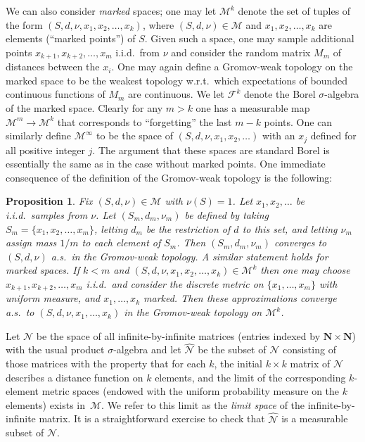 \documentclass[JEP,XML,SOM,Unicode]{cedram}
\let\mathcal\mathscr
\theoremstyle{plain}
\numberwithin{theorem}{section}
\newtheorem{proposition}[theorem]{Proposition}
\theoremstyle{definition}
\newcommand\mmspace{{\mathcal M}}
\newcommand\mmsigma{{\mathcal F}}
\newcommand{\matrixmspace}{\mathcal N}
\newcommand{\N}{\mathbf{N}}
\begin{document}
We can also consider \emph{marked} spaces; one may let $\mmspace^k$ denote the set of tuples of the form $(S,d, \nu, x_1,x_2, \ldots, x_k)$, where $(S,d,\nu) \in \mmspace$ and $x_1, x_2, \ldots, x_k$ are elements (``marked points'') of $S$. Given such a space, one may sample additional points $x_{k+1}, x_{k+2}, \ldots, x_m$ i.i.d.\ from $\nu$ and consider the random matrix $M_m$ of distances between the $x_i$. One may again define a Gromov-weak topology on the marked space to be the weakest topology w.r.t.\ which expectations of bounded continuous functions of $M_m$ are continuous. We let $\mmsigma^k$ denote the Borel $\sigma$-algebra of the marked space. Clearly for any $m > k$ one has a measurable map $\mmspace^m \to \mmspace^k$ that corresponds to ``forgetting'' the last $m-k$ points. One can similarly define $\mmspace^\infty$ to be the space of $(S, d, \nu, x_1, x_2, \ldots)$ with an $x_j$ defined for all positive integer $j$. The argument that these spaces are standard Borel is essentially the same as in the case without marked points. One immediate consequence of the definition of the Gromov-weak topology is the following:

\begin{proposition}
\label{prop::randomapproximatemetricsconverge}
Fix $(S,d,\nu) \in \mmspace$ with $\nu(S) = 1$. Let $x_1, x_2, \ldots$ be i.i.d.\ samples from $\nu$. Let $(S_{m}, d_{m}, \nu_{m})$ be defined by taking $S_{m} = \{x_1, x_2, \ldots, x_{m} \}$, letting $d_{m}$ be the restriction of $d$ to this set, and letting $\nu_{m}$ assign mass $1/m$ to each element of $S_{m}$. Then $(S_{m}, d_{m}, \nu_{m})$ converges to $(S, d, \nu)$ a.s.\ in the Gromov-weak topology. A similar statement holds for marked spaces. If $k < m$ and $(S,d,\nu, x_1, x_2, \ldots, x_{k}) \in \mmspace^{k}$ then one may choose $x_{k+1}, x_{k+2}, \ldots, x_{m}$ i.i.d.\ and consider the discrete metric on $\{x_1, \ldots, x_{m} \}$ with uniform measure, and $x_1,\ldots, x_{k}$ marked. Then these approximations converge a.s.\ to $(S,d,\nu,x_1,\ldots,x_{k})$ in the Gromov-weak topology on $\mmspace^{k}$.
\end{proposition}

Let $\matrixmspace$ be the space of all infinite-by-infinite matrices (entries indexed by $\N \times \N$) with the usual product $\sigma$-algebra and let $\widehat{\matrixmspace}$ be the subset of $\matrixmspace$ consisting of those matrices with the property that for each $k$, the initial $k \times k$ matrix of $\matrixmspace$ describes a distance function on $k$ elements, and the limit of the corresponding $k$-element metric spaces (endowed with the uniform probability measure on the $k$ elements) exists in~$\mmspace$. We refer to this limit as the \emph{limit space} of the infinite-by-infinite matrix. It is a straightforward exercise to check that $\widehat {\matrixmspace}$ is a measurable subset of $\matrixmspace$.
\end{document}
